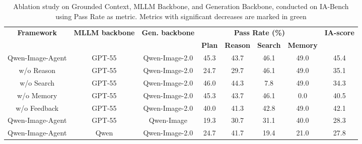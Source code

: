\begin{table}[t]
\centering
\fontsize{8.5pt}{10pt}\selectfont
\setlength{\tabcolsep}{3.5pt}
\renewcommand{\arraystretch}{1.05}
\begin{tabular}{ccc|cccc|c}
\toprule
\multirow{2}{*}{\textbf{Framework}} & \multirow{2}{*}{\textbf{MLLM backbone}} & \multirow{2}{*}{\textbf{Gen. backbone}}
& \multicolumn{4}{c|}{\textbf{Pass Rate (\%)}} 
& \multirow{2}{*}{\textbf{IA-score}} \\
\cmidrule(lr){4-7}
& & & \textbf{Plan} & \textbf{Reason} & \textbf{Search} & \textbf{Memory} & \\

\midrule
Qwen-Image-Agent & GPT-55 & Qwen-Image-2.0
& 45.3 & 43.7 & 46.1 & 49.0 & 45.4 \\
w/o Reason & GPT-55 & Qwen-Image-2.0
& \textcolor{green!60!black}{24.7} & \textcolor{green!60!black}{29.7} & 46.1 & 49.0 & 35.1 \\
w/o Search & GPT-55 & Qwen-Image-2.0
& 46.0 & 44.3 & \textcolor{green!60!black}{7.8} & 49.0 & 34.3 \\
w/o Memory & GPT-55 & Qwen-Image-2.0
& 45.3 & 43.7 & 46.1 & \textcolor{green!60!black}{0.0} & 40.5 \\
w/o Feedback & GPT-55 & Qwen-Image-2.0
& 40.0 & 41.3 & 42.8 & 49.0 & 42.1 \\

\midrule
Qwen-Image-Agent & GPT-55 & Qwen-Image
& \textcolor{green!60!black}{19.3} & \textcolor{green!60!black}{30.7} & 31.1 & 40.0 & 28.3 \\

Qwen-Image-Agent & Qwen & Qwen-Image-2.0
& \textcolor{green!60!black}{24.7} & 41.7 & \textcolor{green!60!black}{19.4} & \textcolor{green!60!black}{21.0} & 27.8 \\
\bottomrule
\end{tabular}
\caption{Ablation study on Grounded Context, MLLM Backbone, and Generation Backbone, conducted on IA-Bench using Pass Rate as metric. Metrics with significant decreases are marked in green}
\label{tab:ablation}
\end{table}